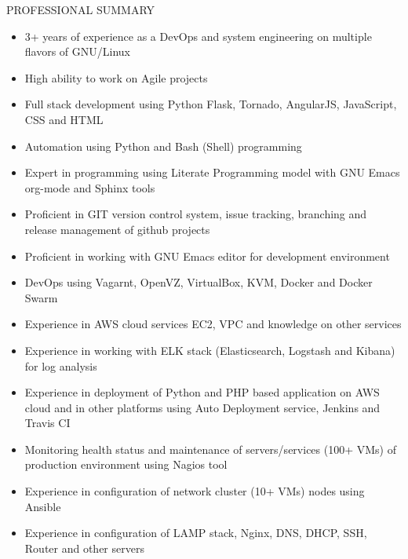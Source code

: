 \documentclass{resume} %
\begin{document}
\begin{rSection}{PROFESSIONAL SUMMARY}
  
  \begin{itemize}
    
  \item 3+ years of experience as a DevOps and system engineering on
    multiple flavors of GNU/Linux

  \item High ability to work on Agile projects

  \item Full stack development using Python Flask, Tornado, AngularJS,
    JavaScript, CSS and HTML

  \item Automation using Python and Bash (Shell) programming

  \item Expert in programming using Literate Programming model with
    GNU Emacs org-mode and Sphinx tools

  \item Proficient in GIT version control system, issue tracking,
    branching and release management of github projects

  \item Proficient in working with GNU Emacs editor for development
    environment
    
  \item DevOps using Vagarnt, OpenVZ, VirtualBox, KVM,
    Docker and Docker Swarm

  \item Experience in AWS cloud services EC2, VPC and knowledge on
    other services

  \item Experience in working with ELK stack (Elasticsearch, Logstash
    and Kibana) for log analysis

  \item Experience in deployment of Python and PHP based application
    on AWS cloud and in other platforms using Auto Deployment
    service, Jenkins and Travis CI

  \item Monitoring health status and maintenance of
    servers/services (100+ VMs) of production environment
    using Nagios tool
    
  \item Experience in configuration of network cluster (10+ VMs)
    nodes using Ansible
    
  \item Experience in configuration of LAMP stack,
    Nginx, DNS, DHCP, SSH, Router and other servers


\end{itemize}
\end{rSection}
\end{document}
